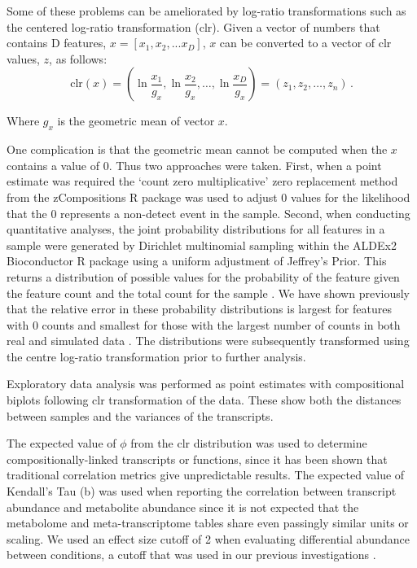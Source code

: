 \documentclass[10pt,letterpaper]{article}
\begin{document}
Some of these problems can be ameliorated by log-ratio transformations such as the centered log-ratio transformation (clr). Given a vector of numbers that contains D features, $x=[x_1,x_2, ... x_D]$,   $x$ can be converted to a vector of clr values, $z$, as follows: 
\begin{equation}\label{eq:clr}
\mathrm{clr}(x)=\left(\ln \frac{x_1}{g_x}, \ln\frac{x_2}{g_x}, \dots, \ln\frac{x_D}{g_x}\right)=\left(z_1,z_2, \dots, z_n \right) \,.
\end{equation}

Where $g_x$ is the geometric mean of vector $x$.

One complication is that the geometric mean cannot be computed when the $x$ contains a value of 0. Thus two approaches were taken. First, when a point estimate was required  the `count zero multiplicative' zero replacement method from the zCompositions R package \cite{PalareaAlbaladejo201585} was used to adjust 0 values for the likelihood that the 0 represents a non-detect event in the sample. Second, when conducting quantitative analyses, the joint probability distributions for all features in a sample were generated by Dirichlet multinomial sampling within the ALDEx2 Bioconductor R package  \cite{fernandes:2013} using a uniform adjustment of Jeffrey's Prior. This returns a distribution of possible values for the probability of  the feature given the feature count and the total count for the sample \cite{fernandes:2013, gloorAJS:2016}. We have shown previously that the relative error in these probability distributions is largest for features with 0 counts and smallest for those with the largest number of counts in both real and simulated data \cite{fernandes:2013}. The distributions were subsequently transformed using the centre log-ratio transformation  prior to further analysis. 

Exploratory data analysis was performed as point estimates with compositional biplots \cite{aitchison2002biplots} following clr transformation of the data. These show both the distances between samples and the variances of the transcripts.

The expected value of $\phi$ \cite{Lovell:2015} from the clr distribution was used to determine compositionally-linked transcripts or functions, since it has been shown that traditional correlation metrics give unpredictable results\cite{pawlowsky2015modeling,pawlowsky2011compositional}. The expected value of Kendall's Tau (b) was used when reporting the correlation between transcript abundance and metabolite abundance since it is not expected that the metabolome and meta-transcriptome tables share even passingly similar units or scaling. We used an effect size cutoff of 2 when evaluating differential abundance between conditions, a cutoff that was used in our previous investigations \cite{macklaim:2013}. 
\end{document}

